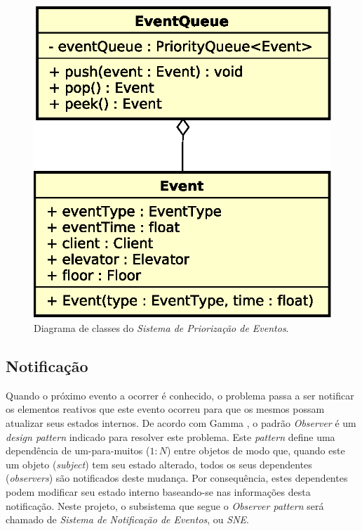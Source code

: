 \begin{figure}[htb!]
  \centering
  \includegraphics[scale=0.6]{img/EventQueue.eps}
  \caption{Diagrama de classes do \textit{Sistema de Priorização de Eventos}.}
\label{fig:diagram:event:manage}
\end{figure}

\subsection{\label{sec:model:notify}Notificação}

Quando o próximo evento a ocorrer é conhecido, o problema passa a ser notificar
os elementos reativos que este evento ocorreu para que os mesmos possam
atualizar seus estados internos. De acordo com Gamma
\cite{Gamma:1995:DPE:186897}, o padrão \textit{Observer} é um \textit{design
pattern} indicado para resolver este problema. Este \textit{pattern} define uma
dependência de um-para-muitos ($1:N$) entre objetos de modo que, quando este um
objeto (\textit{subject}) tem seu estado alterado, todos os seus dependentes
(\textit{observers}) são notificados deste mudança. Por consequência, estes
dependentes podem modificar seu estado interno baseando-se nas informações desta
notificação. Neste projeto, o subsistema que segue o \textit{Observer pattern}
será chamado de \textit{Sistema de Notificação de Eventos}, ou \textit{SNE}.

